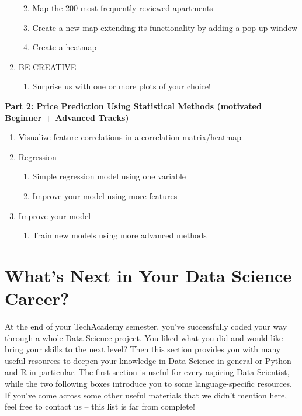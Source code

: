 \documentclass[
  11pt,
]{article}
\providecommand{\tightlist}{%
  \setlength{\itemsep}{0pt}\setlength{\parskip}{0pt}}
\begin{document}
\begin{enumerate}
  \begin{enumerate}
  \def\labelenumii{\alph{enumii}.}
  \item
    Map the 200 most frequently reviewed apartments
  \item
    Create a new map extending its functionality by adding a pop up window
  \item
    Create a heatmap
  \end{enumerate}
\item
  BE CREATIVE

  \begin{enumerate}
  \def\labelenumii{\alph{enumii}.}
  \tightlist
  \item
    Surprise us with one or more plots of your choice!
  \end{enumerate}
\end{enumerate}

\textbf{Part 2: Price Prediction Using Statistical Methods (motivated Beginner + Advanced Tracks)}

\begin{enumerate}
\def\labelenumi{\arabic{enumi}.}
\item
  Visualize feature correlations in a correlation matrix/heatmap
\item
  Regression

  \begin{enumerate}
  \def\labelenumii{\alph{enumii}.}
  \item
    Simple regression model using one variable
  \item
    Improve your model using more features
  \end{enumerate}
\item
  Improve your model

  \begin{enumerate}
  \def\labelenumii{\alph{enumii}.}
  \tightlist
  \item
    Train new models using more advanced methods
  \end{enumerate}
\end{enumerate}

\newpage

\hypertarget{whats-next-in-your-data-science-career}{%
\section{What's Next in Your Data Science Career?}\label{whats-next-in-your-data-science-career}}

At the end of your TechAcademy semester, you've successfully coded your way through a whole Data Science project. You liked what you did and would like bring your skills to the next level? Then this section provides you with many useful resources to deepen your knowledge in Data Science in general or Python and R in particular. The first section is useful for every aspiring Data Scientist, while the two following boxes introduce you to some language-specific resources. If you've come across some other useful materials that we didn't mention here, feel free to contact us -- this list is far from complete!
\end{document}
